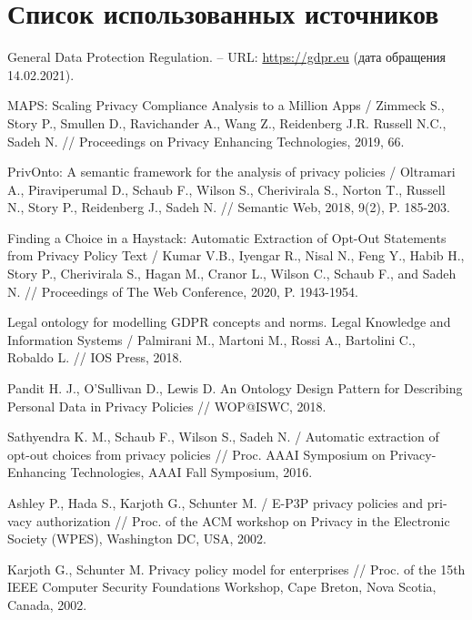 \documentclass[../main]{subfiles}
\begin{document}
\newpage
{}
\section*{Список использованных источников}

\begin{english}
\begin{biblenum}

     General Data Protection Regulation. -- URL: \url{https://gdpr.eu} (\textrussian{дата обращения} 14.02.2021).
    
     MAPS: Scaling Privacy Compliance Analysis to a Million Apps / Zimmeck S., Story P., Smullen D., Ravichander A., Wang Z., Reidenberg J.R. Russell N.C., Sadeh N. // Proceedings on Privacy Enhancing Technologies, 2019, 66.

     PrivOnto: A semantic framework for the analysis of privacy policies / Oltramari A., Piraviperumal D., Schaub F., Wilson S., Cherivirala S., Norton T., Russell N., Story P., Reidenberg J., Sadeh N. // Semantic Web, 2018, 9(2), P. 185-203.

     Finding a Choice in a Haystack: Automatic Extraction of Opt-Out Statements from Privacy Policy Text / Kumar V.B., Iyengar R., Nisal N., Feng Y., Habib H., Story P., Cherivirala S., Hagan M., Cranor L., Wilson C., Schaub F., and Sadeh N. // Proceedings of The Web Conference, 2020, P. 1943-1954.

     Legal ontology for modelling GDPR concepts and norms. Legal Knowledge and Information Systems / Palmirani M., Martoni M., Rossi A., Bartolini C., Robaldo L. // IOS Press, 2018.

     Pandit H. J., O’Sullivan D., Lewis D. An Ontology Design Pattern for Describing Personal Data in Privacy Policies // WOP@ISWC, 2018.

     Sathyendra K. M., Schaub F., Wilson S., Sadeh N. / Automatic extraction of opt-out choices from privacy policies // Proc. AAAI Symposium on Privacy-Enhancing Technologies, AAAI Fall Symposium, 2016.

     Ashley P., Hada S., Karjoth G., Schunter M. / E-P3P privacy policies and privacy authorization // Proc. of the ACM workshop on Privacy in the Electronic Society (WPES), Washington DC, USA, 2002. 

     Karjoth G., Schunter M. Privacy policy model for enterprises // Proc. of the 15th IEEE Computer Security Foundations Workshop, Cape Breton, Nova Scotia, Canada, 2002. 
    

\end{biblenum}
\end{english}
\end{document}
